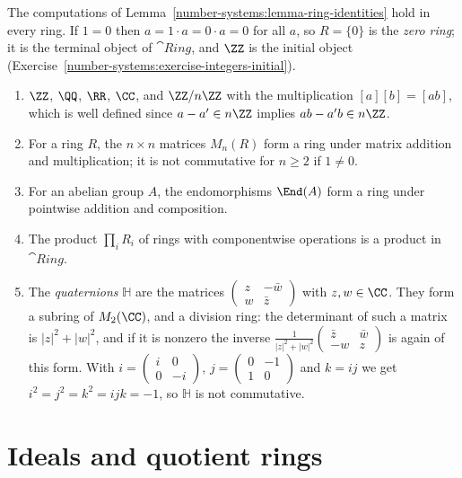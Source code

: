 \begin{remark}\label{rings:remark-zero-ring}
The computations of Lemma~\ref{number-systems:lemma-ring-identities} hold in every
ring. If $1 = 0$ then $a = 1 \cdot a = 0 \cdot a = 0$ for all $a$, so $R = \{0\}$ is the
\emph{zero ring}; it is the terminal object of $\cat{Ring}$, and $\ZZ$ is the initial
object (Exercise~\ref{number-systems:exercise-integers-initial}).
\end{remark}

\begin{example}\label{rings:example-rings}
\begin{enumerate}
\item $\ZZ$, $\QQ$, $\RR$, $\CC$, and $\ZZ/n\ZZ$ with the multiplication
$[a][b] = [ab]$, which is well defined since $a - a' \in n\ZZ$ implies
$ab - a'b \in n\ZZ$.
\item For a ring $R$, the $n \times n$ matrices $M_n(R)$ form a ring under matrix
addition and multiplication; it is not commutative for $n \geq 2$ if $1 \neq 0$.
\item For an abelian group $A$, the endomorphisms $\End(A)$ form a ring under
pointwise addition and composition.
\item The product $\prod_i R_i$ of rings with componentwise operations is a
product in $\cat{Ring}$.
\item The \emph{quaternions} $\mathbb{H}$ are the matrices
$\begin{pmatrix} z & -\bar w \\ w & \bar z \end{pmatrix}$ with $z, w \in \CC$. They form a
subring of $M_2(\CC)$, and a division ring: the determinant of such a matrix is
$|z|^2 + |w|^2$, and if it is nonzero the inverse
$\frac{1}{|z|^2 + |w|^2}\begin{pmatrix} \bar z & \bar w \\ -w & z \end{pmatrix}$ is again of this
form. With $i = \begin{pmatrix} i & 0 \\ 0 & -i \end{pmatrix}$,
$j = \begin{pmatrix} 0 & -1 \\ 1 & 0 \end{pmatrix}$ and $k = ij$ we get
$i^2 = j^2 = k^2 = ijk = -1$, so $\mathbb{H}$ is not commutative.
\end{enumerate}
\end{example}

\section{Ideals and quotient rings}\label{rings:section-ideals}

